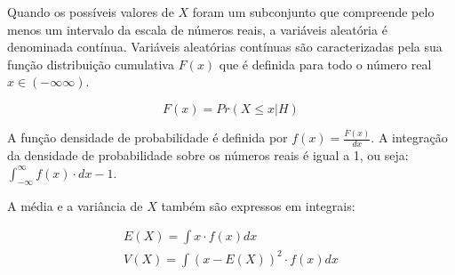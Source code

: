 Quando os possíveis valores de $X$ foram um subconjunto que compreende pelo menos um intervalo da escala de números reais, a variáveis aleatória é denominada contínua. Variáveis aleatórias contínuas são caracterizadas pela sua função distribuição cumulativa $F(x)$ que é definida para todo o número real $x \in (-\infty \infty)$.

\begin{equation}
    F(x) = Pr(X \leq x | H)
\end{equation}

A função densidade de probabilidade é definida por $f(x) = \frac{F(x)}{dx}$. A integração da densidade de probabilidade sobre os números reais é igual a 1, ou seja: $\int_{-\infty}^{\infty}{f(x) \cdot dx} - 1$.

A média e a variância de $X$ também são expressos em integrais:

\begin{equation}
\begin{split}
    E(X) = \int{x \cdot f(x) dx} \\
    V(X) = \int{(x - E(X))^2 \cdot f(x) dx}
\end{split}
\end{equation}
